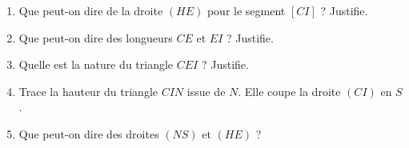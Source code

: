 \documentclass[a4paper,10pt]{report}
\begin{document}
\begin{ex}
\begin{enumerate}[font=\color{exer2}]
\item Que peut-on dire de la droite $(HE)$ pour le segment $[CI]$ ? Justifie.
\item Que peut-on dire des longueurs $CE$ et $EI$ ? Justifie.
\item Quelle est la nature du triangle $CEI$ ? Justifie.
\item Trace la hauteur du triangle $CIN$ issue de $N$. Elle coupe la droite $(CI)$ en $S$.
\item Que peut-on dire des droites $(NS)$ et $(HE)$ ?
\end{enumerate}
\end{ex}
\end{document}
